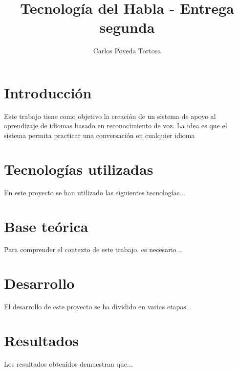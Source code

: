 \documentclass[10pt]{article}
\title{Tecnología del Habla - Entrega segunda}
\author{Carlos Poveda Tortosa}
\date{}
\begin{document}
\maketitle

\tableofcontents

\section{Introducción}
Este trabajo tiene como objetivo la creación de un sistema de apoyo al aprendizaje de idiomas basado en reconocimiento de voz. La idea es que el sistema permita practicar una conversación en cualquier idioma

\section{Tecnologías utilizadas}
En este proyecto se han utilizado las siguientes tecnologías...

\section{Base teórica}
Para comprender el contexto de este trabajo, es necesario...

\section{Desarrollo}
El desarrollo de este proyecto se ha dividido en varias etapas...

\section{Resultados}
Los resultados obtenidos demuestran que...
\end{document}
